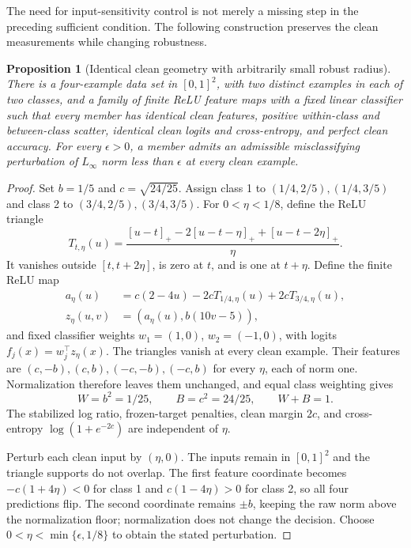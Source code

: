 \documentclass[10pt,a4paper,twocolumn]{article}
\newtheorem{proposition}{Proposition}
\begin{document}
The need for input-sensitivity control is not merely a missing step in
the preceding sufficient condition. The following construction preserves
the clean measurements while changing robustness.

\begin{proposition}[Identical clean geometry with arbitrarily small robust radius]
\label{prop:clean_geometry_fragile_map}
There is a four-example data set in $[0,1]^2$, with two distinct examples
in each of two classes, and a family of finite ReLU feature maps with a
fixed linear classifier such that every member has identical clean
features, positive within-class and between-class scatter, identical clean
logits and cross-entropy, and perfect clean accuracy. For every
$\epsilon>0$, a member admits an admissible misclassifying perturbation
of $L_\infty$ norm less than $\epsilon$ at every clean example.
\end{proposition}
\begin{proof}
Set $b=1/5$ and $c=\sqrt{24/25}$. Assign class 1 to
$(1/4,2/5),(1/4,3/5)$ and class 2 to
$(3/4,2/5),(3/4,3/5)$. For $0<\eta<1/8$, define the ReLU triangle
\[
T_{t,\eta}(u)=
\frac{[u-t]_+-2[u-t-\eta]_++[u-t-2\eta]_+}{\eta}.
\]
It vanishes outside $[t,t+2\eta]$, is zero at $t$, and is one at
$t+\eta$. Define the finite ReLU map
\begin{align*}
a_\eta(u)&=c(2-4u)-2cT_{1/4,\eta}(u)+2cT_{3/4,\eta}(u),\\
z_\eta(u,v)&=(a_\eta(u),b(10v-5)),
\end{align*}
and fixed classifier weights $w_1=(1,0)$, $w_2=(-1,0)$, with logits
$f_j(x)=w_j^\top z_\eta(x)$. The triangles vanish at every clean
example. Their features are $(c,-b),(c,b),(-c,-b),(-c,b)$ for every
$\eta$, each of norm one. Normalization therefore leaves them
unchanged, and equal class weighting gives
\[
W=b^2=1/25,\qquad B=c^2=24/25,\qquad W+B=1.
\]
The stabilized log ratio, frozen-target penalties, clean margin $2c$,
and cross-entropy $\log(1+e^{-2c})$ are independent of $\eta$.

Perturb each clean input by $(\eta,0)$. The inputs remain in $[0,1]^2$
and the triangle supports do not overlap. The first feature coordinate
becomes $-c(1+4\eta)<0$ for class 1 and $c(1-4\eta)>0$ for class 2,
so all four predictions flip. The second coordinate remains $\pm b$,
keeping the raw norm above the normalization floor; normalization
does not change the decision. Choose
$0<\eta<\min\{\epsilon,1/8\}$ to obtain the stated perturbation.
\end{proof}
\end{document}
